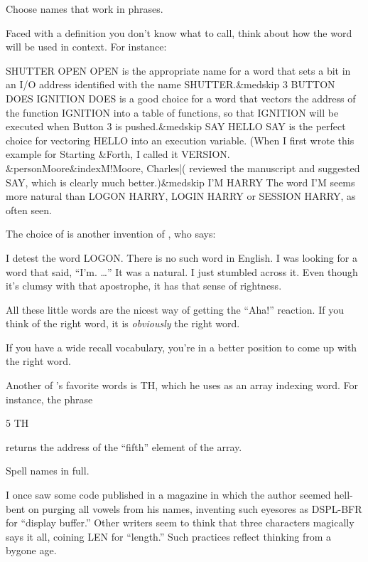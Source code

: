 \begin{tip}
Choose names that work in phrases.
\end{tip}
Faced with a definition you don't know what to call, think about how the
word will be used in context.  For instance:
\begin{Code}[fontfamily=cmss,commandchars=\&\{\}]
SHUTTER OPEN
  OPEN is the appropriate name for a word that sets a
  bit in an I/O address identified with the name
  SHUTTER.&medskip
3 BUTTON DOES IGNITION
  DOES is a good choice for a word that vectors the
  address of the function IGNITION into a table of
  functions, so that IGNITION will be executed when
  Button 3 is pushed.&medskip
SAY HELLO
  SAY is the perfect choice for vectoring HELLO into an
  execution variable.  (When I first wrote this example
  for Starting &Forth{}, I called it VERSION.  &person{Moore}&index{M!Moore, Charles|(}
  reviewed the manuscript and suggested SAY, which is
  clearly much better.)&medskip
I'M HARRY
  The word I'M seems more natural than LOGON HARRY,
  LOGIN HARRY or SESSION HARRY, as often seen.
\end{Code}
\begin{interview}
The choice of  is another invention of , who says:

\begin{tfquot}
I detest the word LOGON.  There is no such word in English.  I was
looking for a word that said, ``I'm. \dots{}'' It was a natural.  I just
stumbled across it.  Even though it's clumsy with that apostrophe, it
has that sense of rightness.

All these little words are the nicest way of getting the ``Aha!''
reaction.  If you think of the right word, it is \emph{obviously} the
right word.

If you have a wide recall vocabulary, you're in a better position to come up
with the right word.
\end{tfquot}
\end{interview}
Another of 's favorite words is TH, which he uses as an array indexing
word.  For instance, the phrase
\begin{Code}
5 TH
\end{Code}
returns the address of the ``fifth'' element of the array.

\begin{tip}
Spell names in full.
\end{tip}
I once saw some \Forth{} code published in a magazine in which the
author seemed hell-bent on purging all vowels from his names, inventing
such eyesores as DSPL-BFR for ``display buffer.'' Other writers seem to
think that three characters magically says it all, coining LEN for
``length.'' Such practices reflect thinking from a bygone age.

